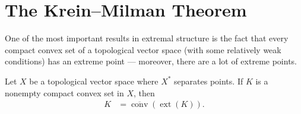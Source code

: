 \documentclass[10pt]{mypackage}
\begin{document}
\section{The Krein--Milman Theorem}%
One of the most important results in extremal structure is the fact that every compact convex set of a topological vector space (with some relatively weak conditions) has an extreme point --- moreover, there are a lot of extreme points.
\begin{theorem}
  Let $X$ be a topological vector space where $X^{\ast}$ separates points. If $K$ is a nonempty compact convex set in $X$, then
  \begin{align*}
    K &= \overline{\operatorname{conv}}\left( \operatorname{ext}\left( K \right) \right).
  \end{align*}
\end{theorem}
\end{document}
